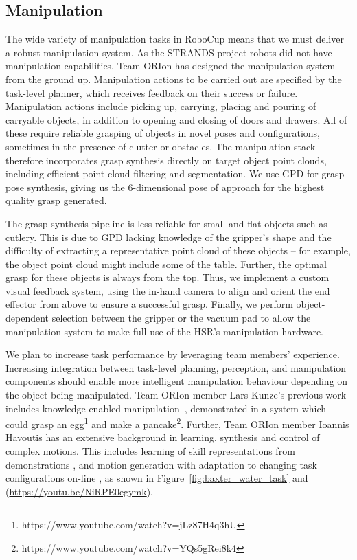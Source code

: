 \documentclass[runningheads,a4paper]{llncs}
\newcommand{\teamori}{Team ORIon}
\begin{document}
\subsection{Manipulation}

The wide variety of manipulation tasks in RoboCup means that we must deliver a robust manipulation system.
%
As the STRANDS project robots did not have manipulation capabilities, \teamori{} has designed the manipulation system from the ground up.
%
Manipulation actions to be carried out are specified by the task-level planner, which receives feedback on their success or failure.
%
Manipulation actions include picking up, carrying, placing and pouring of carryable objects, in addition to opening and closing of doors and drawers.
%
All of these require reliable grasping of objects in novel poses and configurations, sometimes in the presence of clutter or obstacles.
%
The manipulation stack therefore incorporates grasp synthesis directly on target object point clouds, including efficient point cloud filtering and segmentation.
%
We use GPD \cite{GPD1,GPD2} for grasp pose synthesis, giving us the 6-dimensional pose of approach for the highest quality grasp generated.

The grasp synthesis pipeline is less reliable for small and flat objects such as cutlery.
%
This is due to GPD lacking knowledge of the gripper’s shape and the difficulty of extracting a representative point cloud of these objects -- for example, the object point cloud might include some of the table.
%
Further, the optimal grasp for these objects is always from the top. Thus, we implement a custom visual feedback system, using the in-hand camera to align and orient the end effector from above to ensure a successful grasp.
%
Finally, we perform object-dependent selection between the gripper or the vacuum pad to allow the manipulation system to make full use of the HSR's manipulation hardware.

We plan to increase task performance by leveraging team members' experience.
%
Increasing integration between task-level planning, perception, and manipulation components should enable more intelligent manipulation behaviour depending on the object being manipulated.
%
%
\teamori{} member Lars Kunze's previous work includes knowledge-enabled manipulation~\cite{kunze15aij}, demonstrated in a system which could grasp an egg\footnote{https://www.youtube.com/watch?v=jLz87H4q3hU} and make a pancake\footnote{https://www.youtube.com/watch?v=YQs5gRei8k4}. 
%
Further, \teamori{} member Ioannis Havoutis has an extensive background in learning, synthesis and control of complex motions.
%
This includes learning of skill representations from demonstrations \cite{Havoutis17ICRA}, and motion generation with adaptation to changing task configurations on-line \cite{Zeestraten2017-RAL}, as shown in  Figure~\ref{fig:baxter_water_task} and (\url{https://youtu.be/NiRPE0egymk}).
\end{document}
